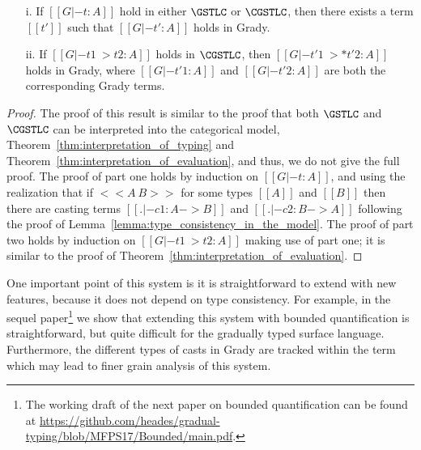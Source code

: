 \begin{lemma}[Translations]
  \label{lemma:translations}
  \begin{center}
    \begin{itemize}
    \item[] 
    \item[i.] If $[[G |- t : A]]$ hold in either $\GSTLC$ or
      $\CGSTLC$, then there exists a term
      $[[t']]$ such that $[[G |- t' : A]]$ holds in Grady.
    \item[ii.] If $[[G |- t1 ~> t2 : A]]$ holds in $\CGSTLC$, then
      $[[G |- t'1 ~>* t'2 : A]]$ holds in Grady, where $[[G |- t'1 :
        A]]$ and $[[G |- t'2 : A]]$ are both the corresponding Grady
      terms.
    \end{itemize}
  \end{center}
\end{lemma}
\begin{proof}
  The proof of this result is similar to the proof that both
  $\GSTLC$ and $\CGSTLC$ can be
  interpreted into the categorical model,
  Theorem~\ref{thm:interpretation_of_typing} and
  Theorem~\ref{thm:interpretation_of_evaluation}, and thus, we do not
  give the full proof.  The proof of part one holds by induction on
  $[[G |- t : A]]$, and using the realization that if $<<A ~ B>>$ for
  some types $[[A]]$ and $[[B]]$ then there are casting terms $[[. |-
      c1 : A -> B]]$ and $[[. |- c2 : B -> A]]$ following the proof of
  Lemma~\ref{lemma:type_consistency_in_the_model}. The proof of part
  two holds by induction on $[[G |- t1 ~> t2 : A]]$ making use of part
  one; it is similar to the proof of
  Theorem~\ref{thm:interpretation_of_evaluation}.
\end{proof}

One important point of this system is it is straightforward to extend
with new features, because it does not depend on type consistency.
For example, in the sequel paper\footnote{The working draft of the
  next paper on bounded quantification can be found at
  \url{https://github.com/heades/gradual-typing/blob/MFPS17/Bounded/main.pdf}.}
we show that extending this system with bounded quantification is
straightforward, but quite difficult for the gradually typed surface
language.  Furthermore, the different types of casts in Grady are
tracked within the term which may lead to finer grain analysis of this
system.

